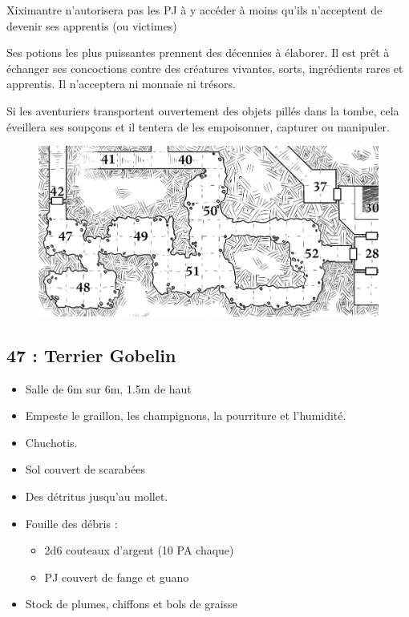 Xiximantre n’autorisera pas les PJ à y accéder à moins qu’ils n’acceptent de devenir ses apprentis (ou victimes)

Ses potions les plus puissantes prennent des décennies à élaborer. 
Il est prêt à échanger ses concoctions contre des créatures vivantes, sorts, ingrédients rares et apprentis. 
Il n’acceptera ni monnaie ni trésors. 

Si les aventuriers transportent ouvertement des objets pillés dans la tombe, cela éveillera ses soupçons et il tentera de les empoisonner, capturer ou manipuler.

\vfill
\pagebreak
\begin{figure}[ht]
  \includegraphics[width=\linewidth]{pics/map_47-52.jpg}
\end{figure}

\subsection{47 : Terrier Gobelin}\label{n3:s47}
\begin{itemize}
  \item Salle de 6m sur 6m, 1.5m de haut 
  \item Empeste le graillon, les champignons, la pourriture et l’humidité.
  \item Chuchotis. 
  \item Sol couvert de scarabées
  \item Des détritus jusqu’au mollet.
  \item Fouille des débris : 
  \begin{itemize}
    \item 2d6 couteaux d’argent (10 PA chaque)
    \item PJ couvert de fange et guano
  \end{itemize}
  \item Stock de plumes, chiffons et bols de graisse
\end{itemize}

